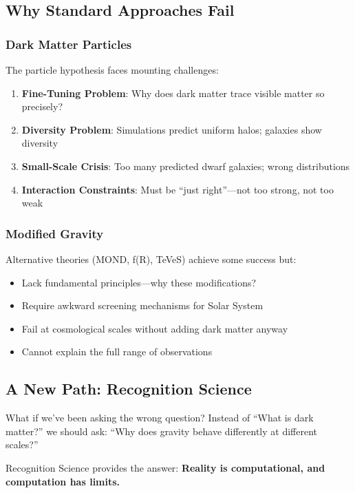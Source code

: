 \documentclass[12pt,letterpaper]{article}
\begin{document}
\subsection{Why Standard Approaches Fail}

\subsubsection{Dark Matter Particles}
The particle hypothesis faces mounting challenges:

\begin{enumerate}
    \item \textbf{Fine-Tuning Problem}: Why does dark matter trace visible matter so precisely?
    \item \textbf{Diversity Problem}: Simulations predict uniform halos; galaxies show diversity
    \item \textbf{Small-Scale Crisis}: Too many predicted dwarf galaxies; wrong distributions
    \item \textbf{Interaction Constraints}: Must be ``just right''—not too strong, not too weak
\end{enumerate}

\subsubsection{Modified Gravity}
Alternative theories (MOND, f(R), TeVeS) achieve some success but:
\begin{itemize}
    \item Lack fundamental principles—why these modifications?
    \item Require awkward screening mechanisms for Solar System
    \item Fail at cosmological scales without adding dark matter anyway
    \item Cannot explain the full range of observations
\end{itemize}

\subsection{A New Path: Recognition Science}

What if we've been asking the wrong question? Instead of ``What is dark matter?'' we should ask: ``Why does gravity behave differently at different scales?''

Recognition Science provides the answer: \textbf{Reality is computational, and computation has limits.}
\end{document}
